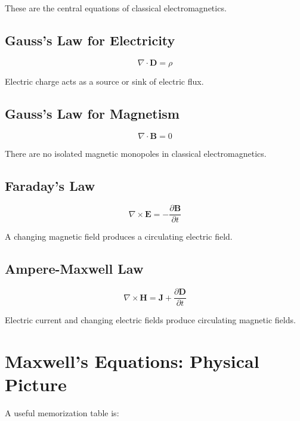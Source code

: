 \documentclass[11pt]{article}
\newcommand{\vect}[1]{\mathbf{#1}}
\begin{document}
These are the central equations of classical electromagnetics.

\subsection{Gauss's Law for Electricity}

\[
\boxed{
\nabla\cdot\vect{D}
=
\rho
}
\]

Electric charge acts as a source or sink of electric flux.

\subsection{Gauss's Law for Magnetism}

\[
\boxed{
\nabla\cdot\vect{B}
=
0
}
\]

There are no isolated magnetic monopoles in classical electromagnetics.

\subsection{Faraday's Law}

\[
\boxed{
\nabla\times\vect{E}
=
-\frac{\partial\vect{B}}{\partial t}
}
\]

A changing magnetic field produces a circulating electric field.

\subsection{Ampere-Maxwell Law}

\[
\boxed{
\nabla\times\vect{H}
=
\vect{J}
+
\frac{\partial\vect{D}}{\partial t}
}
\]

Electric current and changing electric fields produce circulating magnetic fields.



\section{Maxwell's Equations: Physical Picture}

A useful memorization table is:
\end{document}
